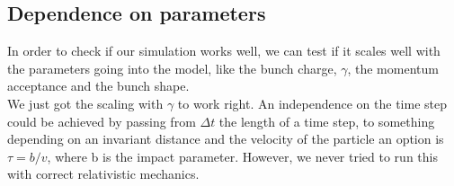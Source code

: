 \subsection{Dependence on parameters}
In order to check if our simulation works well, we can test if it scales well with the parameters going into the model, like the bunch charge, $\gamma$, the momentum acceptance and the bunch shape.\\
We just got the scaling with $\gamma$ to work right. An independence on the time step could be achieved by passing from $\Delta t$ the length of a time step, to something depending on an invariant distance and the velocity of the particle an option is $\tau = b / v$, where b is the impact parameter. However, we never tried to run this with correct relativistic mechanics.
